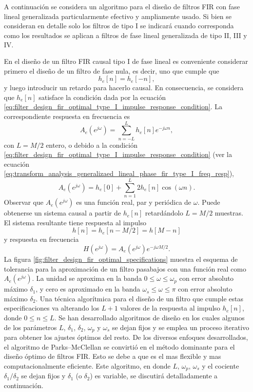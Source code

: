 \documentclass[a4paper]{report}
\begin{document}
A continuación se considera un algoritmo para el diseño de filtros FIR con fase lineal generalizada particularmente efectivo y ampliamente usado. Si bien se consideran en detalle solo los filtros de tipo I se indicará cuando corresponda como los resultados se aplican a filtros de fase lineal generalizada de tipo II, III y IV.

En el diseño de un filtro FIR causal tipo I de fase lineal es conveniente considerar primero el diseño de un filtro de fase nula, es decir, uno que cumple que 
\begin{equation}\label{eq:filter_design_fir_optimal_type_I_impulse_response_condition}
 h_e[n]=h_e[-n], 
\end{equation}
y luego introducir un retardo para hacerlo causal. En consecuencia, se considera que \(h_e[n]\) satisface la condición dada por la ecuación \ref{eq:filter_design_fir_optimal_type_I_impulse_response_condition}. La correspondiente respuesta en frecuencia es
\[
 A_e(e^{j\omega})=\sum_{n=-L}^L h_e[n]e^{-j\omega n},
\]
con \(L=M/2\) entero, o debido a la condición \ref{eq:filter_design_fir_optimal_type_I_impulse_response_condition} (ver la ecuación \ref{eq:transform_analysis_generalizaed_lineal_phase_fir_type_I_freq_resp}),
\begin{equation}\label{eq:filter_design_fir_optimal_type_I_freq_response_Ae}
 A_e(e^{j\omega})=h_e[0]+\sum_{n=1}^L 2h_e[n]\cos(\omega n). 
\end{equation}
Observar que \(A_e(e^{j\omega})\) es una función real, par y periódica de \(\omega\). Puede obtenerse un sistema causal a partir de \(h_e[n]\) retardándolo \(L=M/2\) muestras. El sistema resultante tiene respuesta al impulso
\[
 h[n]=h_e[n-M/2]=h[M-n]
\]
y respuesta en frecuencia
\[
 H(e^{j\omega})=A_e(e^{j\omega})e^{-j\omega M/2}.
\]
La figura \ref{fig:filter_design_fir_optimal_specifications} muestra el esquema de tolerancia para la aproximación de un filtro pasabajos con una función real como \(A_e(e^{j\omega})\). La unidad se aproxima en la banda \(0\leq\omega\leq\omega_p\) con error absoluto máximo \(\delta_1\), y cero es aproximado en la banda \(\omega_s\leq\omega\leq\pi\) con error absoluto máximo \(\delta_2\). Una técnica algorítmica para el diseño de un filtro que cumple estas especificaciones va alterando los \(L+1\) valores de la respuesta al impulso \(h_e[n]\), donde \(0\leq n\leq L\). Se han desarrollado algoritmos de diseño en los cuales algunos de los parámetros \(L\), \(\delta_1\), \(\delta_2\), \(\omega_p\) y \(\omega_s\) se dejan fijos y se emplea un proceso iterativo para obtener los ajustes óptimos del resto. De los diversos enfoques desarrollados, el algoritmo de Parks--McClellan \cite{parks1972chebyshev}\cite{parks1972program}\cite{mcclellan1973computer} se convirtió en el método dominante para el diseño óptimo de filtros FIR. Esto se debe a que es el mas flexible y mas computacionalmente eficiente. Este algoritmo, en donde \(L\), \(\omega_p\), \(\omega_s\) y el cociente \(\delta_1/\delta_2\) se dejan fijos y \(\delta_1\) (o \(\delta_2\)) es variable, se discutirá detalladamente a continuación.
\end{document}
